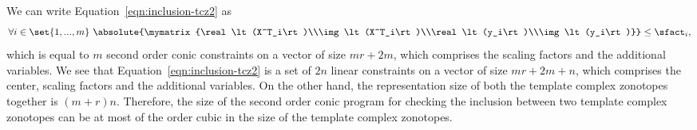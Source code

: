 %
\begin{remark}
  We can write Equation~\ref{eqn:inclusion-tcz2} as
  \[
\forall
i\in\set{1,...,m}~\absolute{\mymatrix{\real\lt(X^T_i\rt)\\\img\lt(X^T_i\rt)\\\real\lt(y_i\rt)\\\img\lt(y_i\rt)}}\leq\sfact_i,
  \]
%
  which is equal to $m$ second order conic constraints on a vector of
  size $mr+2m$, which comprises the scaling factors and the additional
  variables.  We see that Equation~\ref{eqn:inclusion-tcz2} is a set
  of $2n$ linear constraints on a vector of size $mr+2m+n$, which
  comprises the center, scaling factors and the additional variables.
  On the other hand, the representation size of both the template
  complex zonotopes together is $(m+r)n$.  Therefore, the size of the
  second order conic program for checking the inclusion between two
  template complex zonotopes can be at most of the order cubic in
  the size of the template complex zonotopes.
\end{remark}
%
%

